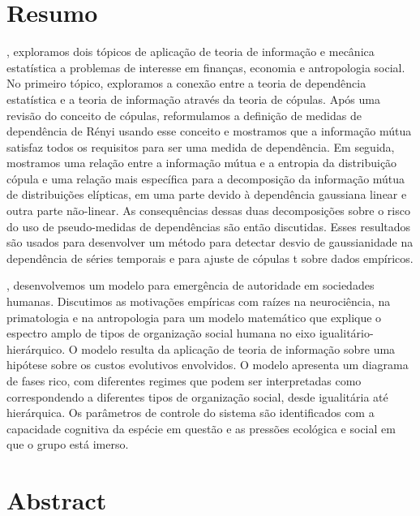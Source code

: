 \chapter*{Resumo}
, exploramos dois tópicos de aplicação de teoria de informação e mecânica estatística a problemas de interesse em finanças, economia e antropologia social. No primeiro tópico, exploramos a conexão entre a teoria de dependência estatística e a teoria de informação através da teoria de cópulas. Após uma revisão do conceito de cópulas, reformulamos a definição de medidas de dependência de Rényi\cite{Renyi1959} usando esse conceito e mostramos que a informação mútua satisfaz todos os requisitos para ser uma medida de dependência. Em seguida, mostramos uma relação entre a informação mútua e a entropia da distribuição cópula e uma relação mais específica para a decomposição da informação mútua de distribuições elípticas, em uma parte devido à dependência gaussiana linear e outra parte não-linear. As consequências dessas duas decomposições sobre o risco do uso de pseudo-medidas de dependências são então discutidas. Esses resultados são usados para desenvolver um método para detectar desvio de gaussianidade na dependência de séries temporais e para ajuste de cópulas t sobre dados empíricos\cite{Calsaverini2009}.

, desenvolvemos um modelo para emergência de autoridade em sociedades humanas. Discutimos as motivações empíricas com raízes na neurociência, na primatologia e na antropologia para um modelo matemático que explique o espectro amplo de tipos de organização social humana no eixo igualitário-hierárquico. O modelo resulta da aplicação de teoria de informação sobre uma hipótese sobre os custos evolutivos envolvidos. O modelo apresenta um diagrama de fases rico, com diferentes regimes que podem ser interpretadas como correspondendo a diferentes tipos de organização social, desde igualitária até hierárquica. Os parâmetros de controle do sistema são identificados com a capacidade cognitiva da espécie em questão e as pressões ecológica e social em que o grupo está imerso.

\chapter*{Abstract}
 

